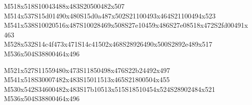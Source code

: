 \documentclass{article}
\begin{document}
\begin{multicols}{5}
\begin{center}
M518x518S10043488x483S20500482x507 %
\\M514x537S15d01490x480S15d0a487x502S21100493x464S21100494x523 %
\\M541x538S10020516x487S10028469x508S27e10459x486S27e08518x472S2fd00491x463 %
\\M528x532S14c4f473x471S14c41502x468S28926490x500S2892e489x517 %
\\M536x504S38800464x496 %

M521x527S11559480x473S11850498x476S22b24492x497 %
\\M541x518S30007482x483S15011513x465S21800504x455 %
\\M530x542S34600482x483S17b10513x515S18510454x524S28902484x521 %
\\M536x504S38800464x496 %

\end{center}
\end{multicols}
\end{document}
